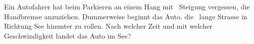 Ein Autofahrer hat beim Parkieren an einem Hang mit \stgO\ Steigung vergessen, die Handbremse anzuziehen. Dummerweise beginnt das Auto, die \sStO\ lange Strasse in Richtung See hinunter zu rollen. Nach welcher Zeit und mit welcher Geschwindigkeit landet das Auto im See?
